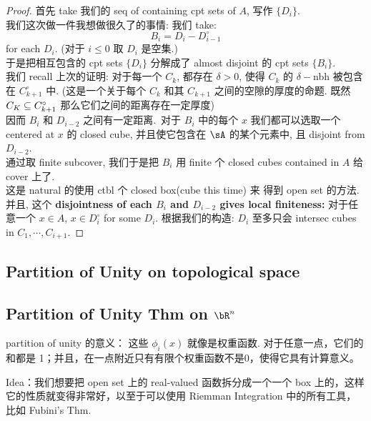 \documentclass[lang=cn,11pt]{elegantbook}
\begin{document}
\begin{proof}
    首先 take 我们的 seq of containing cpt sets of $A$, 写作 $\{D_i\}$.\\
    我们这次做一件我想做很久了的事情: 我们 take:
    $$
    B_i = D_i - D_{i-1}^{\circ}
    $$ for each $D_i$. (对于 $i\leq 0$ 取 $D_i$ 是空集.)\\
    于是把相互包含的 cpt sets $\{D_i\}$ 分解成了 almost disjoint 的 cpt sets $\{B_i\}$. \\
    我们 recall 上次的证明: 对于每一个 $C_k$, 都存在 $\delta > 0$, 使得 $C_k$ 的 $\delta-$nbh 被包含在 $C_{k+1} ^ {\circ}$ 中. (这是一个关于每个 $C_k$ 和其 $C_{k+1}$ 之间的空隙的厚度的命题. 既然 $C_K \subseteq C_{k+1} ^ {\circ}$ 那么它们之间的距离存在一定厚度)\\
    因而 $B_i$ 和 $D_{i-2}$ 之间有一定距离.\
    对于 $B_i$ 中的每个 $x$ 我们都可以选取一个 centered at $x$ 的 closed cube, 并且使它包含在 $\sA$ 的某个元素中, 且 disjoint from $D_{i-2}$.\\
    通过取 finite subcover, 我们于是把 $B_i$ 用 finite 个 closed cubes contained in $A$ 给 cover 上了.\\
    这是 natural 的使用 ctbl 个 closed box(cube this time) 来 得到 open set 的方法.\\
    并且, 这个 \textbf{disjointness of each $B_i$ and $D_{i-2}$ gives local finiteness:} 对于任意一个 $x\in A$, $x \in D_i ^{\circ}$ for some $D_i$. 根据我们的构造: $D_i$ 至多只会 intersec cubes in $C_1, \cdots, C_{i+1}$. 
\end{proof}


\subsection{Partition of Unity on topological space}





\subsection{Partition of Unity Thm on $\bR^n$}



partition of unity 的意义：
这些 $\phi_i(x)$ 就像是权重函数. 对于任意一点，它们的和都是 1；并且，在一点附近只有有限个权重函数不是0，使得它具有计算意义。

Idea：我们想要把 open set 上的 real-valued 函数拆分成一个一个 box 上的，这样它的性质就变得非常好，以至于可以使用 Riemman Integration 中的所有工具，比如 Fubini's Thm.
\end{document}
